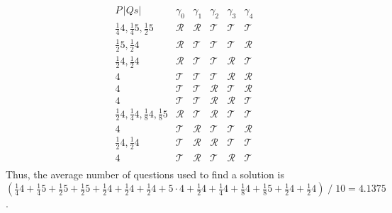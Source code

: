 \documentclass[twoside,twocolumn,a4paper,11pt]{article}
\theoremstyle{definition}
\begin{document}
\begin{equation}
\label{nOfQSolver}
 \begin{matrix}
  P\,|Qs| & \gamma_0    & \gamma_1    & \gamma_2    & \gamma_3    & \gamma_4    \\
  \frac{1}{4}4,\frac{1}{4}5,\frac{1}{2}5
          & \mathcal{R} & \mathcal{R} & \mathcal{T} & \mathcal{T} & \mathcal{T} \\
  \frac{1}{2}5,\frac{1}{2}4
          & \mathcal{R} & \mathcal{T} & \mathcal{T} & \mathcal{T} & \mathcal{R} \\[1pt]
  \frac{1}{2}4,\frac{1}{2}4
          & \mathcal{R} & \mathcal{T} & \mathcal{T} & \mathcal{R} & \mathcal{T} \\
  4       & \mathcal{T} & \mathcal{T} & \mathcal{T} & \mathcal{R} & \mathcal{R} \\
  4       & \mathcal{T} & \mathcal{T} & \mathcal{R} & \mathcal{T} & \mathcal{R} \\
  4       & \mathcal{T} & \mathcal{T} & \mathcal{R} & \mathcal{R} & \mathcal{T} \\
  \frac{1}{2}4,\frac{1}{4}4,\mathit{\frac{1}{8}4},\mathit{\frac{1}{8}5}
          & \mathcal{R} & \mathcal{T} & \mathcal{R} & \mathcal{T} & \mathcal{T} \\

  4       & \mathcal{T} & \mathcal{R} & \mathcal{T} & \mathcal{T} & \mathcal{R} \\
  \frac{1}{2}4,\frac{1}{2}4 
          & \mathcal{T} & \mathcal{R} & \mathcal{R} & \mathcal{T} & \mathcal{T} \\

  4       & \mathcal{T} & \mathcal{R} & \mathcal{T} & \mathcal{R} & \mathcal{T} \\
 \end{matrix}
\end{equation}
Thus, the average number of questions used to find a solution is
\( ( \frac{1}{4}4 + \frac{1}{4}5 + \frac{1}{2}5 + 
     \frac{1}{2}5 + \frac{1}{2}4 +
     \frac{1}{2}4 + \frac{1}{2}4 +
     5\cdot 4 +
     \frac{1}{2}4 + \frac{1}{4}4 + \frac{1}{8}4 + \frac{1}{8}5 +
     \frac{1}{2}4 + \frac{1}{2}4 ) \;/\; 10 = 4.1375 \).
\end{document}
